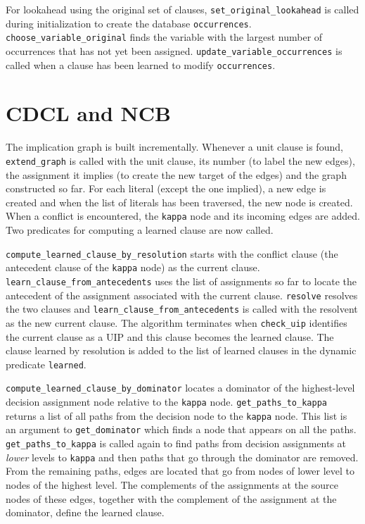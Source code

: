 \documentclass[11pt]{article}
\newcommand*{\p}[1]{\textup{\texttt{#1}}}
\begin{document}
For lookahead using the original set of clauses, \p{set\_original\_lookahead} is called during initialization to create the database \p{occurrences}. \p{choose\_variable\_original} finds the variable with the largest number of occurrences that has not yet been assigned. \p{update\_variable\_occurrences} is called when a clause has been learned to modify \p{occurrences}.


\section{CDCL and NCB}

The implication graph is built incrementally. Whenever a unit clause is
found, \p{extend\_graph} is called with the unit clause, its number (to
label the new edges), the assignment it implies (to create the new
target of the edges) and the graph constructed so far. For each literal
(except the one implied), a new edge is created and when the list of
literals has been traversed, the new node is created. When a conflict is
encountered, the \p{kappa} node and its incoming edges are added.
Two predicates for computing a learned clause are now called.

\p{compute\_learned\_clause\_by\_resolution} starts with the conflict
clause (the antecedent clause of the \p{kappa} node) as the current
clause. \p{learn\_clause\_from\_antecedents} uses the list of
assignments so far to locate the antecedent of the assignment associated
with the current clause. \p{resolve} resolves the two clauses and
\p{learn\_clause\_from\_antecedents} is called with the resolvent as the
new current clause. The algorithm terminates when \p{check\_uip}
identifies the current clause as a UIP and this clause becomes the
learned clause. The clause learned by resolution is added to the list of learned clauses in the dynamic predicate \p{learned}.

\p{compute\_learned\_clause\_by\_dominator} locates a dominator of the
highest-level decision assignment node relative to the \p{kappa} node.
\p{get\_paths\_to\_kappa} returns a list of all paths
from the decision node to the \p{kappa} node. This list is an argument
to \p{get\_dominator} which finds a node that appears on all the paths.
\p{get\_paths\_to\_kappa} is called again to find paths from decision
assignments at \textit{lower} levels to \p{kappa} and then paths that go
through the dominator are removed. From the remaining paths, edges are
located that go from nodes of lower level to nodes of the highest level.
The complements of the assignments at the source nodes of these edges,
together with the complement of the assignment at the dominator, define
the learned clause.
\end{document}

